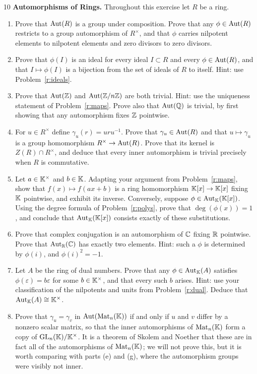 \documentclass[Notebook.tex]{subfiles}
\begin{document}
\hrulefill

\begin{problem}{10}\label{r:auto}
	\textbf{Automorphisms of Rings.} Throughout this exercise let $R$ be a ring.
	\begin{enumerate}[label=(\alph*),ref=\theenumi\alph*]
		\item Prove that $\operatorname{Aut}(R)$ is a group under composition. Prove that any $\phi\in\operatorname{Aut}(R)$ restricts to a group automorphism of $R^\times$, and that $\phi$ carries nilpotent elements to nilpotent elements and zero divisors to zero divisors.
		\item Prove that $\phi(I)$ is an ideal for every ideal $I\subset R$ and every $\phi\in\operatorname{Aut}(R)$, and that $I\mapsto\phi(I)$ is a bijection from the set of ideals of $R$ to itself. Hint: use Problem~\ref{r:ideals}.
		\item Prove that $\operatorname{Aut}(\mathbb Z)$ and $\operatorname{Aut}(\mathbb Z/n\mathbb Z)$ are both trivial. Hint: use the uniqueness statement of Problem~\ref{r:maps}. Prove also that $\operatorname{Aut}(\mathbb Q)$ is trivial, by first showing that any automorphism fixes $\mathbb Z$ pointwise.
		\item For $u\in R^\times$ define $\gamma_u(r)=uru^{-1}$. Prove that $\gamma_u\in\operatorname{Aut}(R)$ and that $u\mapsto\gamma_u$ is a group homomorphism $R^\times\to\operatorname{Aut}(R)$. Prove that its kernel is $Z(R)\cap R^\times$, and deduce that every inner automorphism is trivial precisely when $R$ is commutative.
		\item Let $a\in\mathbb K^\times$ and $b\in\mathbb K$. Adapting your argument from Problem~\ref{r:maps}, show that $f(x)\mapsto f(ax+b)$ is a ring homomorphism $\mathbb K[x]\to\mathbb K[x]$ fixing $\mathbb K$ pointwise, and exhibit its inverse. Conversely, suppose $\phi\in\operatorname{Aut}_\mathbb K(\mathbb K[x])$. Using the degree formula of Problem~\ref{r:polys}, prove that $\deg(\phi(x))=1$, and conclude that $\operatorname{Aut}_\mathbb K(\mathbb K[x])$ consists exactly of these substitutions.
		\item Prove that complex conjugation is an automorphism of $\mathbb C$ fixing $\mathbb R$ pointwise. Prove that $\operatorname{Aut}_\mathbb R(\mathbb C)$ has exactly two elements. Hint: such a $\phi$ is determined by $\phi(i)$, and $\phi(i)^2=-1$.
		\item Let $A$ be the ring of dual numbers. Prove that any $\phi\in\operatorname{Aut}_\mathbb K(A)$ satisfies $\phi(\varepsilon)=b\varepsilon$ for some $b\in\mathbb K^\times$, and that every such $b$ arises. Hint: use your classification of the nilpotents and units from Problem~\ref{r:dual}. Deduce that $\operatorname{Aut}_\mathbb K(A)\cong\mathbb K^\times$.
		\item Prove that $\gamma_u=\gamma_v$ in $\operatorname{Aut}(\operatorname{Mat}_n(\mathbb K))$ if and only if $u$ and $v$ differ by a nonzero scalar matrix, so that the inner automorphisms of $\operatorname{Mat}_n(\mathbb K)$ form a copy of $\text{GL}_n(\mathbb K)/\mathbb K^\times$. It is a theorem of Skolem and Noether that these are in fact all of the automorphisms of $\operatorname{Mat}_n(\mathbb K)$; we will not prove this, but it is worth comparing with parts (e) and (g), where the automorphism groups were visibly not inner.
	\end{enumerate}
\end{problem}
\end{document}
